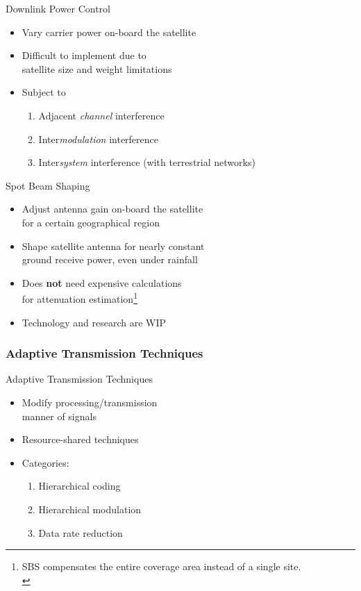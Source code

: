 \documentclass[pdf]{beamer}
\begin{document}
\begin{frame}{Downlink Power Control}
  \begin{itemize}\Large
    \item Vary carrier power on-board the satellite
    \item Difficult to implement due to\\ satellite size and weight limitations
    \item Subject to
      \begin{enumerate}\large
        \item Adjacent \emph{channel} interference
        \item Inter\emph{modulation} interference
        \item Inter\emph{system} interference (with terrestrial networks)
      \end{enumerate}
  \end{itemize}
\end{frame}

\begin{frame}{Spot Beam Shaping}\Large
  \begin{itemize}
    \item Adjust antenna gain on-board the satellite\\
      for a certain geographical region
    \item Shape satellite antenna for nearly constant\\
      ground receive power, even under rainfall
    \item Does \textbf{not} need expensive calculations\\
      for attenuation estimation\footnote{SBS compensates
      the entire coverage area instead of a single site.\\}
    \item Technology and research are WIP
  \end{itemize}
\end{frame}

\subsubsection{Adaptive Transmission Techniques}
\begin{frame}{Adaptive Transmission Techniques}
  \begin{itemize}\Large
    \item Modify processing/transmission\\ manner of signals
    \item Resource-shared techniques
    \item Categories:
      \begin{enumerate}\large
        \item Hierarchical coding
        \item Hierarchical modulation
        \item Data rate reduction
      \end{enumerate}
  \end{itemize}
\end{frame}
\end{document}
